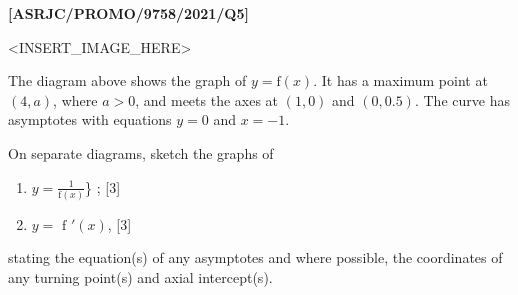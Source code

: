 \item \textbf{{[}ASRJC/PROMO/9758/2021/Q5{]} }
\noindent \begin{center}
<INSERT\_IMAGE\_HERE>
\par\end{center}

The diagram above shows the graph of $y=\text{f}(x)$. It has a maximum
point at $(4,a)$, where $a>0$, and meets the axes at $(1,0)$ and
$(0,0.5)$. The curve has asymptotes with equations $y=0$ and $x=-1$. 

On separate diagrams, sketch the graphs of 
\begin{enumerate}
\item $y=\frac{1}{\text{f}\left(x\right)}$\} ; \hfill{}{[}3{]}
\item $y=\text{ f }'\left(x\right)$,\hfill{} {[}3{]}
\end{enumerate}
stating the equation(s) of any asymptotes and where possible, the
coordinates of any turning point(s) and axial intercept(s).